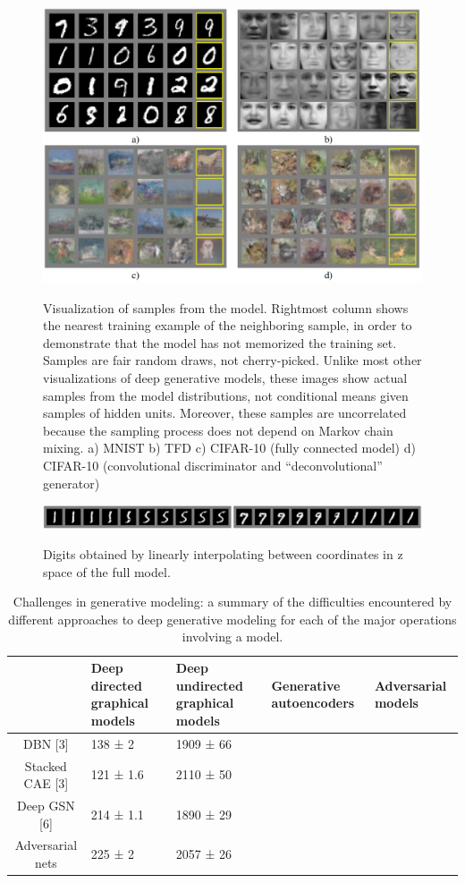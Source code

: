 \documentclass{article}
\begin{document}
\begin{figure}[h]
    \centering
    \includegraphics[width=\textwidth]{figure/fig2.PNG}
    \label{fig:fig2}
    \caption{Visualization of samples from the model. Rightmost column shows the nearest training example of
the neighboring sample, in order to demonstrate that the model has not memorized the training set. Samples
are fair random draws, not cherry-picked. Unlike most other visualizations of deep generative models, these
images show actual samples from the model distributions, not conditional means given samples of hidden units.
Moreover, these samples are uncorrelated because the sampling process does not depend on Markov chain
mixing. a) MNIST b) TFD c) CIFAR-10 (fully connected model) d) CIFAR-10 (convolutional discriminator
and “deconvolutional” generator)}
\end{figure}

\begin{figure}[h]
    \centering
    \includegraphics[width=\textwidth]{figure/fig3.PNG}
    \label{fig:fig3}
    \caption{Digits obtained by linearly interpolating between coordinates in z space of the full model.}
\end{figure}
\newpage
\begin{table}[h]
    \begin{tabular*}{\textwidth}{c|p{3cm}|p{3cm}|p{3cm}|l} \\
        & Deep directed graphical models &
        Deep undirected graphical models &
        Generative autoencoders & Adversarial models\\ \hline
        DBN [3] & 138 ± 2 & 1909 ± 66 \\  
        Stacked CAE [3] & 121 ± 1.6 & 2110 ± 50 \\
        Deep GSN [6] & 214 ± 1.1 & 1890 ± 29 \\
        Adversarial nets & 225 ± 2 & 2057 ± 26
    \end{tabular*}
    \caption{Challenges in generative modeling: a summary of the difficulties encountered by different approaches
to deep generative modeling for each of the major operations involving a model.}
    \label{tab:my_label2}
\end{table}
\end{document}
